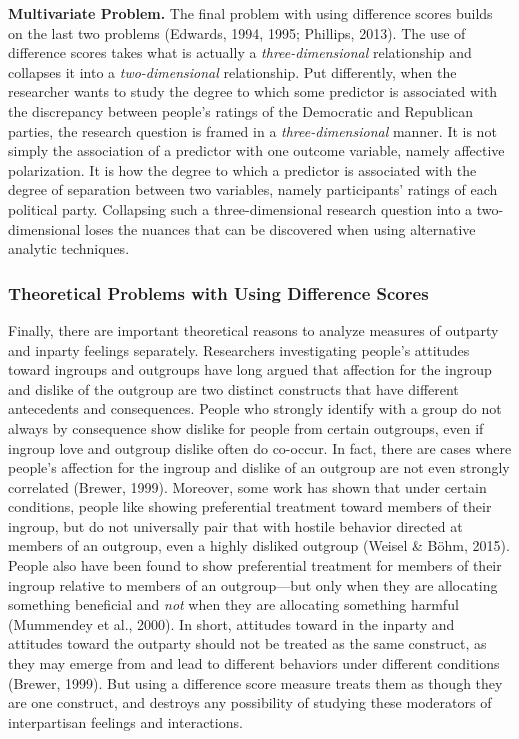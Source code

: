 \documentclass[authordate, meta]{jote-new-article}
\begin{document}
	\textbf{Multivariate Problem. }The final problem with using difference scores builds on the last two problems (Edwards, 1994, 1995; Phillips, 2013). The use of difference scores takes what is actually a \emph{three-dimensional }relationship and collapses it into a \emph{two-dimensional }relationship. Put differently, when the researcher wants to study the degree to which some predictor is associated with the discrepancy between people's ratings of the Democratic and Republican parties, the research question is framed in a \emph{three-dimensional }manner. It is not simply the association of a predictor with one outcome variable, namely affective polarization. It is how the degree to which a predictor is associated with the degree of separation between two variables, namely participants' ratings of each political party. Collapsing such a three-dimensional research question into a two-dimensional loses the nuances that can be discovered when using alternative analytic techniques.



	\subsubsection{Theoretical Problems with Using Difference Scores}



	Finally, there are important theoretical reasons to analyze measures of outparty and inparty feelings separately. Researchers investigating people's attitudes toward ingroups and outgroups have long argued that affection for the ingroup and dislike of the outgroup are two distinct constructs that have different antecedents and consequences. People who strongly identify with a group do not always by consequence show dislike for people from certain outgroups, even if ingroup love and outgroup dislike often do co-occur. In fact, there are cases where people's affection for the ingroup and dislike of an outgroup are not even strongly correlated (Brewer, 1999). Moreover, some work has shown that under certain conditions, people like showing preferential treatment toward members of their ingroup, but do not universally pair that with hostile behavior directed at members of an outgroup, even a highly disliked outgroup (Weisel \& Böhm, 2015). People also have been found to show preferential treatment for members of their ingroup relative to members of an outgroup—but only when they are allocating something beneficial and \emph{not }when they are allocating something harmful (Mummendey et al., 2000). In short, attitudes toward in the inparty and attitudes toward the outparty should not be treated as the same construct, as they may emerge from and lead to different behaviors under different conditions (Brewer, 1999). But using a difference score measure treats them as though they are one construct, and destroys any possibility of studying these moderators of interpartisan feelings and interactions.
\end{document}

